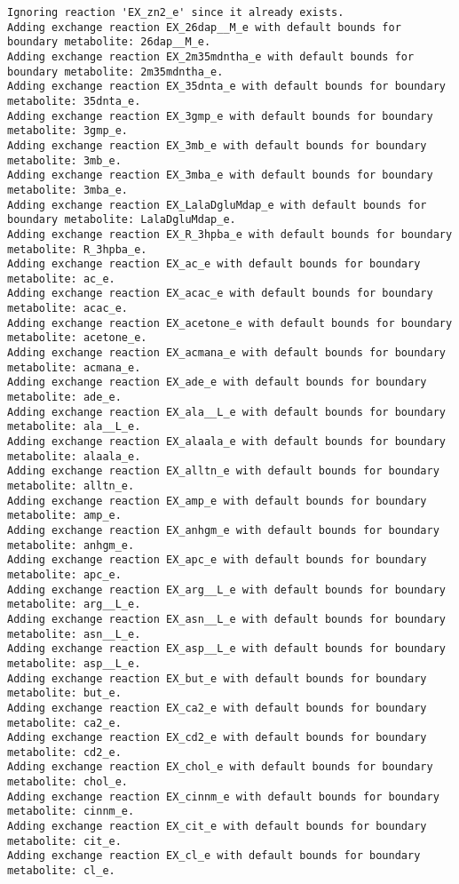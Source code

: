 \documentclass[
  letterpaper,
  DIV=11,
  numbers=noendperiod]{scrartcl}
\begin{document}
\begin{verbatim}
Ignoring reaction 'EX_zn2_e' since it already exists.
Adding exchange reaction EX_26dap__M_e with default bounds for boundary metabolite: 26dap__M_e.
Adding exchange reaction EX_2m35mdntha_e with default bounds for boundary metabolite: 2m35mdntha_e.
Adding exchange reaction EX_35dnta_e with default bounds for boundary metabolite: 35dnta_e.
Adding exchange reaction EX_3gmp_e with default bounds for boundary metabolite: 3gmp_e.
Adding exchange reaction EX_3mb_e with default bounds for boundary metabolite: 3mb_e.
Adding exchange reaction EX_3mba_e with default bounds for boundary metabolite: 3mba_e.
Adding exchange reaction EX_LalaDgluMdap_e with default bounds for boundary metabolite: LalaDgluMdap_e.
Adding exchange reaction EX_R_3hpba_e with default bounds for boundary metabolite: R_3hpba_e.
Adding exchange reaction EX_ac_e with default bounds for boundary metabolite: ac_e.
Adding exchange reaction EX_acac_e with default bounds for boundary metabolite: acac_e.
Adding exchange reaction EX_acetone_e with default bounds for boundary metabolite: acetone_e.
Adding exchange reaction EX_acmana_e with default bounds for boundary metabolite: acmana_e.
Adding exchange reaction EX_ade_e with default bounds for boundary metabolite: ade_e.
Adding exchange reaction EX_ala__L_e with default bounds for boundary metabolite: ala__L_e.
Adding exchange reaction EX_alaala_e with default bounds for boundary metabolite: alaala_e.
Adding exchange reaction EX_alltn_e with default bounds for boundary metabolite: alltn_e.
Adding exchange reaction EX_amp_e with default bounds for boundary metabolite: amp_e.
Adding exchange reaction EX_anhgm_e with default bounds for boundary metabolite: anhgm_e.
Adding exchange reaction EX_apc_e with default bounds for boundary metabolite: apc_e.
Adding exchange reaction EX_arg__L_e with default bounds for boundary metabolite: arg__L_e.
Adding exchange reaction EX_asn__L_e with default bounds for boundary metabolite: asn__L_e.
Adding exchange reaction EX_asp__L_e with default bounds for boundary metabolite: asp__L_e.
Adding exchange reaction EX_but_e with default bounds for boundary metabolite: but_e.
Adding exchange reaction EX_ca2_e with default bounds for boundary metabolite: ca2_e.
Adding exchange reaction EX_cd2_e with default bounds for boundary metabolite: cd2_e.
Adding exchange reaction EX_chol_e with default bounds for boundary metabolite: chol_e.
Adding exchange reaction EX_cinnm_e with default bounds for boundary metabolite: cinnm_e.
Adding exchange reaction EX_cit_e with default bounds for boundary metabolite: cit_e.
Adding exchange reaction EX_cl_e with default bounds for boundary metabolite: cl_e.

\end{verbatim}
\end{document}
